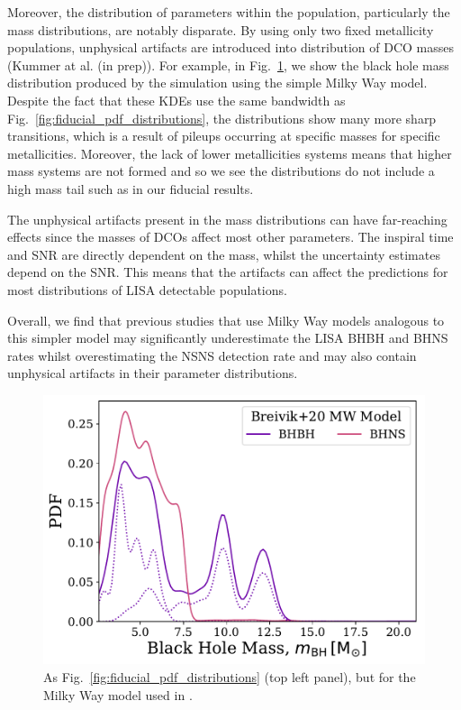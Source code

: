 Moreover, the distribution of parameters within the population, particularly the mass distributions, are notably disparate. By using only two fixed metallicity populations, unphysical artifacts are introduced into distribution of DCO masses (Kummer at al. (in prep)). For example, in Fig.~\ref{fig:bh_mass_simple_mw}, we show the black hole mass distribution produced by the simulation using the simple Milky Way model. Despite the fact that these KDEs use the same bandwidth as Fig.~\ref{fig:fiducial_pdf_distributions}, the distributions show many more sharp transitions, which is a result of pileups occurring at specific masses for specific metallicities. Moreover, the lack of lower metallicities systems means that higher mass systems are not formed and so we see the distributions do not include a high mass tail such as in our fiducial results.

The unphysical artifacts present in the mass distributions can have far-reaching effects since the masses of DCOs affect most other parameters. The inspiral time and SNR are directly dependent on the mass, whilst the uncertainty estimates depend on the SNR. This means that the artifacts can affect the predictions for most distributions of LISA detectable populations.

Overall, we find that previous studies that use Milky Way models analogous to this simpler model may significantly underestimate the LISA BHBH and BHNS rates whilst overestimating the NSNS detection rate and may also contain unphysical artifacts in their parameter distributions.

\begin{figure}[htb]
    \centering
    \includegraphics[width=\columnwidth]{../figures/BH_mass_dist_simple_mw.pdf}
    \caption{As Fig.~\ref{fig:fiducial_pdf_distributions} (top left panel), but for the Milky Way model used in \citet{Breivik+2020}.}
    \label{fig:bh_mass_simple_mw}
\end{figure}

